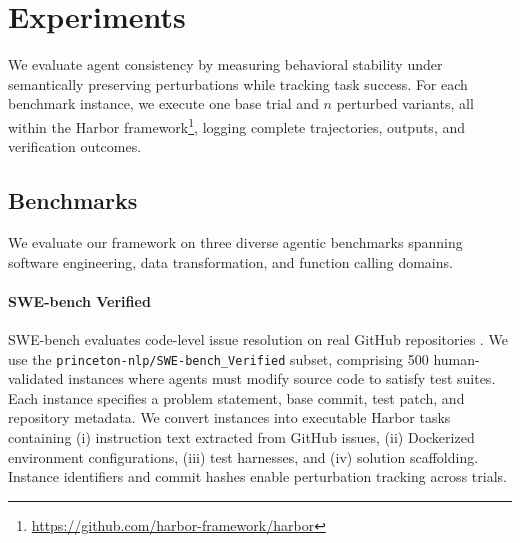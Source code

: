 \documentclass{article}
\theoremstyle{plain}
\theoremstyle{definition}
\theoremstyle{remark}
\begin{document}



\section{Experiments}
\label{sec:exp}

We evaluate agent consistency by measuring behavioral stability under semantically preserving perturbations while tracking task success. For each benchmark instance, we execute one base trial and $n$ perturbed variants, all within the Harbor framework\footnote{\url{https://github.com/harbor-framework/harbor}}, logging complete trajectories, outputs, and verification outcomes.

\subsection{Benchmarks}

We evaluate our framework on three diverse agentic benchmarks spanning software engineering, data transformation, and function calling domains.

\paragraph{SWE-bench Verified}
SWE-bench evaluates code-level issue resolution on real GitHub repositories \cite{jimenez2024swebench}. We use the \texttt{princeton-nlp/SWE-bench\_Verified} subset, comprising 500 human-validated instances where agents must modify source code to satisfy test suites. Each instance specifies a problem statement, base commit, test patch, and repository metadata. We convert instances into executable Harbor tasks containing (i) instruction text extracted from GitHub issues, (ii) Dockerized environment configurations, (iii) test harnesses, and (iv) solution scaffolding. Instance identifiers and commit hashes enable perturbation tracking across trials.
\end{document}
